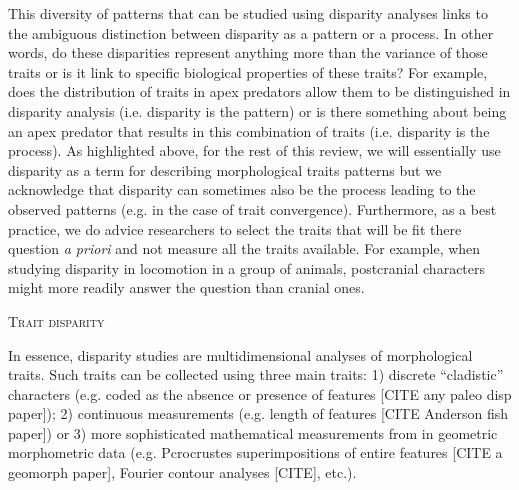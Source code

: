 \documentclass[12pt,letterpaper]{article}
\renewcommand{\section}[1]{%
\bigskip
\begin{center}
\begin{Large}
\normalfont\scshape #1
\medskip
\end{Large}
\end{center}}
\begin{document}
This diversity of patterns that can be studied using disparity analyses links to the ambiguous distinction between disparity as a pattern or a process.
In other words, do these disparities represent anything more than the variance of those traits or is it link to specific biological properties of these traits?
For example, does the distribution of traits in apex predators allow them to be distinguished in disparity analysis (i.e. disparity is the pattern) or is there something about being an apex predator that results in this combination of traits (i.e. disparity is the process).
As highlighted above, for the rest of this review, we will essentially use disparity as a term for describing morphological traits patterns but we acknowledge that disparity can sometimes also be the process leading to the observed patterns (e.g. in the case of trait convergence).
Furthermore, as a best practice, we do advice researchers to select the traits that will be fit there question \textit{a priori} and not measure all the traits available.
For example, when studying disparity in locomotion in a group of animals, postcranial characters might more readily answer the question than cranial ones.

\section{Trait disparity}
In essence, disparity studies are multidimensional analyses of morphological traits.
Such traits can be collected using three main traits: 1) discrete ``cladistic'' characters (e.g. coded as the absence or presence of features [CITE any paleo disp paper]); 2) continuous measurements (e.g. length of features [CITE Anderson fish paper]) or 3) more sophisticated mathematical measurements from in geometric morphometric data (e.g. Pcrocrustes superimpositions of entire features [CITE a geomorph paper], Fourier contour analyses [CITE], etc.).
\end{document}
